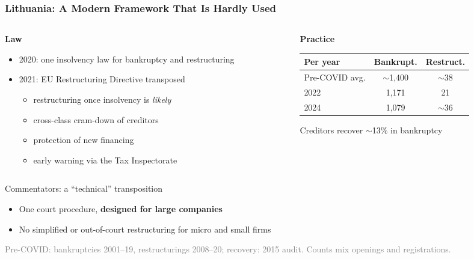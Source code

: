 \documentclass[aspectratio=169,xcolor=table]{beamer}
\newcommand{\src}[1]{\par\vfill{\scriptsize\textcolor{gray}{#1}}}
\begin{document}
\begin{frame}[label=lithuania] \frametitle{Lithuania: A Modern Framework That Is Hardly Used \hfill \hyperlink{policy}{}}

\begin{columns}[T,onlytextwidth]
\begin{column}{0.53\textwidth}
\textbf{Law}
\begin{itemize} \small
    \item 2020: one insolvency law for bankruptcy and restructuring
    \item 2021: EU Restructuring Directive transposed
    \begin{itemize} \footnotesize
        \item restructuring once insolvency is \textit{likely}
        \item cross-class cram-down of creditors
        \item protection of new financing
        \item early warning via the Tax Inspectorate
    \end{itemize}
\end{itemize}
\end{column}
\begin{column}{0.44\textwidth}
\textbf{Practice} \\[1mm]
\footnotesize
\renewcommand{\arraystretch}{0.95}
\begin{tabular}{lcc}
\toprule
\textbf{Per year} & \textbf{Bankrupt.} & \textbf{Restruct.} \\
\midrule
Pre-COVID avg.  & $\sim$1,400 & $\sim$38 \\
2022            & 1,171 & 21 \\
2024            & 1,079 & $\sim$36 \\
\bottomrule
\end{tabular} \vspace{1mm}

\small Creditors recover $\sim$13\% in bankruptcy
\end{column}
\end{columns}
\vspace{3mm}

\normalsize
Commentators: a ``technical'' transposition
\begin{itemize} \small
    \item One court procedure, \textbf{designed for large companies}
    \item No simplified or out-of-court restructuring for micro and small firms
\end{itemize}

\src{Pre-COVID: bankruptcies 2001--19, restructurings 2008--20; recovery: 2015 audit. Counts mix openings and registrations.}

\end{frame}
\end{document}
